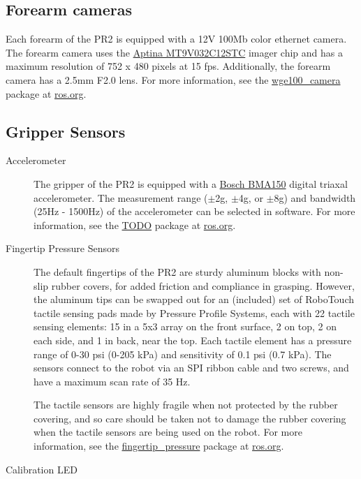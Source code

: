 \subsection{Forearm cameras}
Each forearm of the PR2 is equipped with a 12V 100Mb color ethernet camera. The forearm camera uses the 
\href{http://www.aptina.com/products/image_sensors/mt9v032c12stc/#overview}{Aptina MT9V032C12STC}  imager chip
and has a maximum resolution of 752 x 480 pixels at 15 fps. Additionally, the forearm camera has a 2.5mm F2.0 lens.  
For more information, see the \href{http://www.ros.org/wiki/wge100_camera}{wge100\_camera} package
at \href{http://www.ros.org}{ros.org}.

\subsection{Gripper Sensors}
\begin{description}

\item[Accelerometer]
The gripper of the PR2 is equipped with a \href{http://www.bosch-sensortec.com/content/language1/html/3474.htm}{Bosch BMA150} 
digital triaxal accelerometer. The measurement range ($\pm$2g, $\pm$4g, or $\pm$8g) and bandwidth (25Hz - 1500Hz) 
of the accelerometer can be selected in software. For more information, see the \href{http://www.ros.org/wiki/wge100_camera}{TODO} 
package at \href{http://www.ros.org}{ros.org}.

\item[Fingertip Pressure Sensors]
The default fingertips of the PR2 are sturdy aluminum blocks with non-slip 
rubber covers, for added friction and compliance in grasping.  However, the 
aluminum tips can be swapped out for an (included) set of RoboTouch tactile 
sensing pads made by Pressure Profile Systems, each with 22 tactile sensing 
elements: 15 in a 5x3 array on the front surface, 2 on top, 2 on each side, 
and 1 in back, near the top.  Each tactile element has a pressure range of 
0-30 psi (0-205 kPa) and sensitivity of 0.1 psi (0.7 kPa).  The sensors 
connect to the robot via an SPI ribbon cable and two screws, and have a 
maximum scan rate of 35 Hz.

The tactile sensors are highly fragile when not protected by the rubber 
covering, and so care should be taken not to damage the rubber covering when 
the tactile sensors are being used on the robot.  For more information, 
see the \href{http://www.ros.org/wiki/fingertip\_pressure}{fingertip\_pressure} package at \href{http://ros.org}{ros.org}.

\item[Calibration LED]

\end{description}


